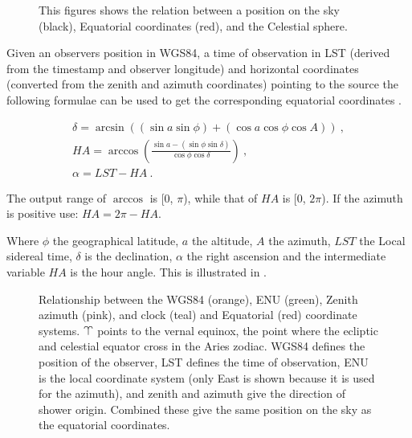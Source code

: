 \begin{figure}
    \centering
    
    \caption{This figures shows the relation between a position on the
             sky (black), Equatorial coordinates (red), and the
             Celestial sphere.}
    \label{fig:equatorial}
\end{figure}

Given an observers position in WGS84, a time of observation in LST
(derived from the \gps timestamp and observer longitude) and horizontal
coordinates (converted from the zenith and azimuth coordinates) pointing
to the source the following formulae can be used to get the
corresponding equatorial coordinates \cite[p. 37]{duffet-smith:1990aa}.

\begin{equation}
    \label{eq:equatorial}
    \begin{array}{l}
        \delta = \arcsin{\left((\sin{a} \sin{\phi}) +
                               (\cos{a} \cos{\phi} \cos{A})\right)} \ , \\
        \mathit{HA} = \arccos{\left(\frac{\sin{a} - (\sin{\phi} \sin{\delta})}
                                         {\cos{\phi} \cos{\delta}}\right)} \ , \\
        \alpha = \mathit{LST} - \mathit{HA} \ .
    \end{array}
\end{equation}

The output range of $\arccos$ is [0, $\pi$), while that of $\mathit{HA}$ is
[0, $2\pi$). If the azimuth is positive use: $\mathit{HA} = 2 \pi -
\mathit{HA}$.

Where $\phi$ the geographical latitude, $a$ the altitude, $A$ the
azimuth, $\mathit{LST}$ the Local sidereal time, $\delta$ is the
declination, $\alpha$ the right ascension and the intermediate variable
$\mathit{HA}$ is the hour angle. This is illustrated in
.


\begin{figure}
    \centering
    
    \caption{Relationship between the WGS84 (orange), ENU (green),
             Zenith azimuth (pink), and clock (teal) and Equatorial
             (red) coordinate systems. $\vernal$ points to the vernal
             equinox, the point where the ecliptic and celestial equator
             cross in the Aries zodiac. WGS84 defines the position of
             the observer, LST defines the time of observation, ENU is
             the local coordinate system (only East is shown because it
             is used for the azimuth), and zenith and azimuth give the
             direction of shower origin. Combined these give the same
             position on the sky as the equatorial coordinates.}
    \label{fig:wgs84_zenazi_lst_equatorial}
\end{figure}


